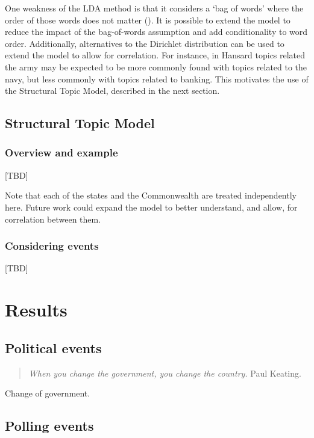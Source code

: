 \documentclass[12pt,]{article}
\begin{document}
One weakness of the LDA method is that it considers a `bag of words'
where the order of those words does not matter (\citet{blei2012}). It is
possible to extend the model to reduce the impact of the bag-of-words
assumption and add conditionality to word order. Additionally,
alternatives to the Dirichlet distribution can be used to extend the
model to allow for correlation. For instance, in Hansard topics related
the army may be expected to be more commonly found with topics related
to the navy, but less commonly with topics related to banking. This
motivates the use of the Structural Topic Model, described in the next
section.

\subsection{Structural Topic Model}\label{structural-topic-model}

\subsubsection{Overview and example}\label{overview-and-example}

{[}TBD{]}

Note that each of the states and the Commonwealth are treated
independently here. Future work could expand the model to better
understand, and allow, for correlation between them.

\subsubsection{Considering events}\label{considering-events}

{[}TBD{]}

\section{Results}\label{results}

\subsection{Political events}\label{political-events}

\begin{quote}
\emph{When you change the government, you change the country.} Paul
Keating.
\end{quote}

Change of government.

\subsection{Polling events}\label{polling-events}
\end{document}
